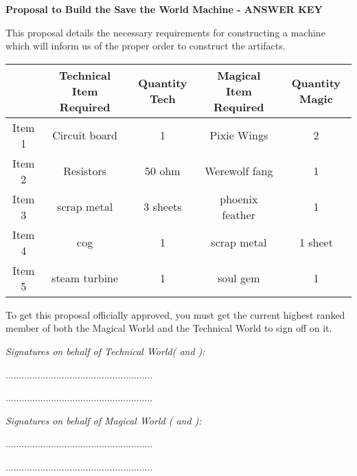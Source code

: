 \documentclass[white]{guildcamp3}
\begin{document}
\name{\wProposalAns{}} %
\large\textbf{Proposal to Build the Save the World Machine - ANSWER KEY}  


This proposal details the necessary requirements for constructing a machine which will inform us of the proper order to construct the artifacts. 


\begin{tabular}{|c|c|c|c|c|}
	\hline \rule[-2ex]{0pt}{5.5ex}  & Technical Item Required & Quantity Tech & Magical Item Required & Quantity Magic \\ 
	\hline \rule[-2ex]{0pt}{5.5ex} Item 1 & Circuit board & 1 & Pixie Wings & 2 \\ 
	\hline \rule[-2ex]{0pt}{5.5ex} Item 2 & Resistors & 50 ohm & Werewolf fang & 1 \\ 
	\hline \rule[-2ex]{0pt}{5.5ex} Item 3 & scrap metal & 3 sheets & phoenix feather & 1 \\ 
	\hline \rule[-2ex]{0pt}{5.5ex} Item 4 & cog & 1 & scrap metal & 1 sheet \\ 
	\hline \rule[-2ex]{0pt}{5.5ex} Item 5 & steam turbine & 1 & soul gem & 1 \\ 
	\hline 
\end{tabular} 

To get this proposal officially approved, you must get the current highest ranked member of both the Magical World and the Technical World to sign off on it. 



\emph{Signatures on behalf of Technical World(\cPoliOne{\intro} and \cPoliTwo{\intro}): }

.......................................................

.......................................................

\emph{Signatures on behalf of Magical World (\cNobleOne{\intro} and \cNobleTwo{\intro}):}

.......................................................

.......................................................


\end{document}
